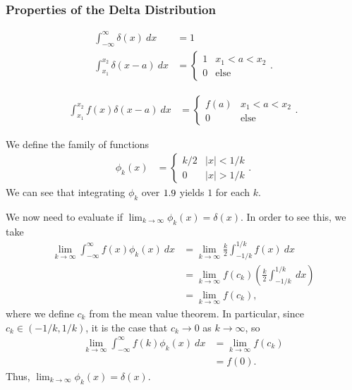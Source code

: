 \documentclass[10pt]{mypackage}
\begin{document}
\subsubsection{Properties of the Delta Distribution}%
\begin{description}[leftmargin=0pt]
  \item[Normalization:]
    \begin{align*}
      \int_{-\infty}^{\infty} \delta(x)\:dx &= 1\\
      \int_{x_1}^{x_2} \delta(x-a)\:dx &= \begin{cases}
        1 & x_1 < a < x_2\\
        0 & \text{else}
      \end{cases}.
    \end{align*}
  \item[Sieve:]
    \begin{align*}
      \int_{x_1}^{x_2} f(x)\delta(x-a)\:dx &= \begin{cases}
        f(a) & x_1 < a < x_2\\
        0 & \text{else}
      \end{cases}.
    \end{align*}
\end{description}
\begin{example}
  We define the family of functions
  \begin{align*}
    \phi_k(x) &= \begin{cases}
      k/2 & |x| < 1/k\\
      0 & |x| > 1/k
    \end{cases}.
  \end{align*}
  We can see that integrating $\phi_k$ over $1.9$ yields $1$ for each $k$.\newline

  We now need to evaluate if $\lim_{k\rightarrow\infty}\phi_k(x) = \delta(x)$. In order to see this, we take
  \begin{align*}
    \lim_{k\rightarrow\infty}\int_{-\infty}^{\infty} f(x)\phi_k(x)\:dx &= \lim_{k\rightarrow\infty}\frac{k}{2}\int_{-1/k}^{1/k} f(x)\:dx\\
                                                                       &= \lim_{k\rightarrow\infty}f\left(c_k\right)\left(\frac{k}{2}\int_{-1/k}^{1/k} \:dx\right)\\
                                                                       &= \lim_{k\rightarrow\infty}f\left(c_k\right),
  \end{align*}
  where we define $c_k$ from the mean value theorem. In particular, since $c_k \in \left(-1/k,1/k\right)$, it is the case that $c_k\rightarrow 0$ as $k\rightarrow\infty$, so
  \begin{align*}
    \lim_{k\rightarrow\infty}\int_{-\infty}^{\infty} f(k)\phi_k(x)\:dx &= \lim_{k\rightarrow\infty}f\left(c_k\right)\\
                                                                       &= f(0).
  \end{align*}
  Thus, $\lim_{k\rightarrow\infty}\phi_k(x) = \delta(x)$.
\end{example}
\end{document}
